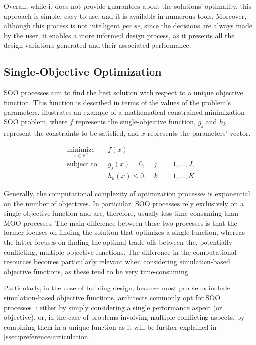 	Overall, while it does not provide guarantees about the solutions’ optimality, this approach is simple, easy to use, and it is available in numerous tools. Moreover, although this process is not intelligent \textit{per se}, since the decisions are always made by the user, it enables a more informed design process, as it presents all the design variations generated and their associated performance.
	
	\subsection{Single-Objective Optimization}
	\label{ssec:soo}
	
	\ac{SOO} processes aim to find the best solution with respect to a unique objective function. This function is described in terms of the values of the problem's parameters.  illustrates an example of a mathematical constrained minimization \ac{SOO} problem, where $f$ represents the single-objective function, $g_j$ and $h_k$ represent the constraints to be satisfied, and $x$ represents the parameters' vector.
	
	\begin{equation} \label{eq:soo}
	\begin{aligned}
	& \underset{x \in \mathbb{R}^n}{\text{minimize}}
	& & f(x) \\
	& \text{subject to}
	& & g_j(x) = 0, & \; j &= 1, \ldots, J, \\ 
	&&& h_k(x) \leq 0, & \; k &= 1, \ldots, K.
	\end{aligned}
	\end{equation}
	
	Generally, the computational complexity of optimization processes is exponential on the number of objectives. In particular, \ac{SOO} processes rely exclusively on a single objective function and are, therefore, usually less time-consuming than \ac{MOO} processes. The main difference between these two processes is that the former focuses on finding the solution that optimizes a single function, whereas the latter focuses on finding the optimal trade-offs between the, potentially conflicting, multiple objective functions. The difference in the computational resources becomes particularly relevant when considering simulation-based objective functions, as these tend to be very time-consuming. 
	
	Particularly, in the case of building design, because most problems include simulation-based objective functions, architects commonly opt for \ac{SOO} processes~\cite{Wortmann2017Opossum}: either by simply considering a single performance aspect (or objective), or, in the case of problems involving multiple conflicting aspects, by combining them in a unique function as it will be further explained in \cref{ssec:preferencesarticulation}.
		
